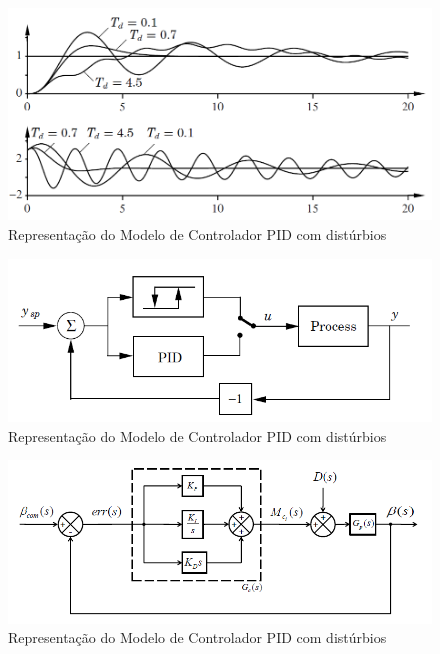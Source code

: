 \begin{figure}[htb]
  \caption{Representação do Modelo de Controlador PID com distúrbios}
  \begin{center}
      \includegraphics[scale=0.65]{img/pid_astrom_p70}
  \end{center}
\end{figure}

\begin{figure}[htb]
  \caption{Representação do Modelo de Controlador PID com distúrbios}
  \begin{center}
      \includegraphics[scale=0.75]{img/pid_autotuning_relay_astrom_p239}
  \end{center}
\end{figure}

\begin{figure}[htb]
  \caption{Representação do Modelo de Controlador PID com distúrbios}
  \begin{center}
      \includegraphics[scale=0.75]{img/pid_controller_Snider_p35}
  \end{center}
\end{figure}

